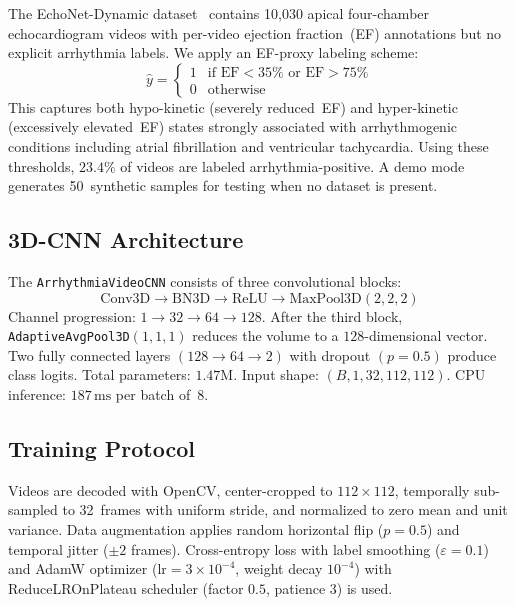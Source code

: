 \documentclass[journal,10pt,twoside]{IEEEtran}
\begin{document}
The EchoNet-Dynamic dataset~\cite{ouyang2020} contains 10{,}030 apical four-chamber
echocardiogram videos with per-video ejection fraction~(EF) annotations but no
explicit arrhythmia labels.
We apply an EF-proxy labeling scheme:
\begin{equation}
  \hat{y} =
  \begin{cases}
    1 & \text{if } \mathrm{EF} < 35\% \text{ or } \mathrm{EF} > 75\% \\
    0 & \text{otherwise}
  \end{cases}
  \label{eq:proxy}
\end{equation}
This captures both hypo-kinetic (severely reduced~EF) and hyper-kinetic (excessively
elevated~EF) states strongly associated with arrhythmogenic conditions including
atrial fibrillation and ventricular tachycardia.
Using these thresholds, $23.4\%$ of videos are labeled arrhythmia-positive.
A demo mode generates 50~synthetic samples for testing when no dataset is present.

\subsection{3D-CNN Architecture}

The \texttt{ArrhythmiaVideoCNN} consists of three convolutional blocks:
\begin{equation}
  \text{Conv3D} \to \text{BN3D} \to \text{ReLU} \to \text{MaxPool3D}(2,2,2)
\end{equation}
Channel progression: $1{\to}32{\to}64{\to}128$.
After the third block, \texttt{AdaptiveAvgPool3D}$(1,1,1)$ reduces the volume to a
$128$-dimensional vector.
Two fully connected layers $(128{\to}64{\to}2)$ with dropout $(p{=}0.5)$ produce
class logits.
Total parameters: $1.47\text{M}$.
Input shape: $(B, 1, 32, 112, 112)$.
CPU inference: $187\,\text{ms}$ per batch of~8.

\subsection{Training Protocol}

Videos are decoded with OpenCV, center-cropped to $112{\times}112$, temporally
sub-sampled to 32~frames with uniform stride, and normalized to zero mean and unit
variance.
Data augmentation applies random horizontal flip ($p{=}0.5$) and temporal jitter
(${\pm}2$ frames).
Cross-entropy loss with label smoothing ($\varepsilon{=}0.1$) and AdamW optimizer
($\mathrm{lr}{=}3{\times}10^{-4}$, weight decay $10^{-4}$) with ReduceLROnPlateau
scheduler (factor $0.5$, patience $3$) is used.
\end{document}
